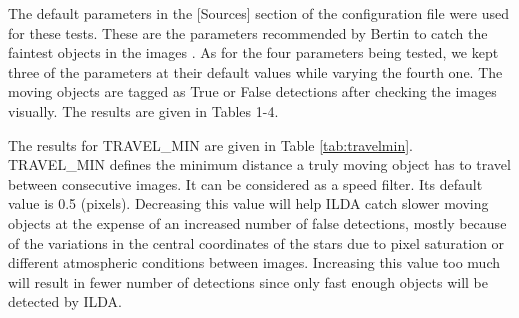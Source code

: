 \documentclass[review]{elsarticle}
\begin{document}
The default parameters in the [Sources] section of the configuration file were used for these tests. These are the parameters recommended by Bertin to catch the faintest objects in the images \citep{sextractor_manual}. As for the four parameters being tested, we kept three of the parameters at their default values while varying the fourth one. The moving objects are tagged as True or False detections after checking the images visually. The results are given in Tables 1-4.

The results for TRAVEL\_MIN are given in Table \ref{tab:travelmin}. TRAVEL\_MIN defines the minimum distance a truly moving object has to travel between consecutive images. It can be considered as a speed filter. Its default value is 0.5 (pixels). Decreasing this value will help ILDA catch slower moving objects at the expense of an increased number of false detections, mostly because of the variations in the central coordinates of the stars due to pixel saturation or different atmospheric conditions between images. Increasing this value too much will result in fewer number of detections since only fast enough objects will be detected by ILDA.
\end{document}
